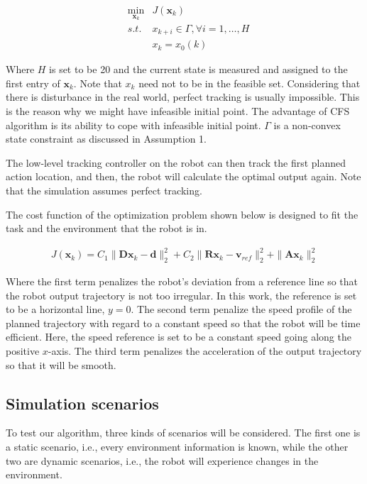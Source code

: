 \documentclass{ifacconf}
\begin{document}
\begin{eqnarray}
&\min_{\mathbf{x}_{k}} & J(\mathbf{x}_k)\\
&s.t.& x_{k+i}\in\Gamma,\forall i=1,\ldots,H\\
&&         x_{k}=x_0(k)
\end{eqnarray}

Where $H$ is set to be 20 and the current state is measured and assigned to the first entry of $\mathbf{x}_{k}$. Note that $x_{k}$ need not to be in the feasible set. Considering that there is disturbance in the real world, perfect tracking is usually impossible. This is the reason why we might have infeasible initial point. The advantage of CFS algorithm is its ability to cope with infeasible initial point. $\Gamma$ is a non-convex state constraint as discussed in Assumption 1.

The low-level tracking controller on the robot can then track the first planned action location, and then, the robot will calculate the optimal output again. Note that the simulation assumes perfect tracking.

The cost function of the optimization problem shown below is designed to fit the task and the environment that the robot is in.

\begin{eqnarray}
J(\mathbf{x}_k) = C_1\|\mathbf{D}\mathbf{x}_k-\mathbf{d}\|_{2}^2 + C_2 \|\mathbf{R}\mathbf{x}_k-\mathbf{v}_{ref}\|_2^2 +\|\mathbf{A}\mathbf{x}_{k}\|_2^2  
\end{eqnarray}

Where the first term penalizes the robot's deviation from a reference line so that the robot output trajectory is not too irregular. In this work, the reference is set to be a horizontal line, $y=0$. The second term penalize the speed profile of the planned trajectory with regard to a constant speed so that the robot will be time efficient. Here, the speed reference is set to be a constant speed going along the positive $x$-axis. The third term penalizes the acceleration of the output trajectory so that it will be smooth.  

\subsection{Simulation scenarios}

To test our algorithm, three kinds of scenarios will be considered. The first one is a static scenario, i.e., every environment information is known, while the other two are dynamic scenarios, i.e., the robot will experience changes in the environment.
\end{document}
